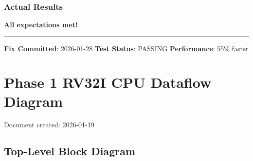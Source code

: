 \subsubsection{Actual Results}\label{cr:fix:pc-mismatch-fix:actual-results}

\begin{record}

\ok{} \textbf{All expectations met!}

\begin{center}\rule{0.5\linewidth}{0.5pt}\end{center}

\textbf{Fix Committed}: 2026-01-28 \textbf{Test Status}: \ok{} PASSING
\textbf{Performance}: \warn{} 55\% faster

\end{record}

\section{Phase 1 RV32I CPU Dataflow Diagram}\label{cr:fix:cpu-dataflow-diagram}

\begin{record}

Document created: 2026-01-19

\end{record}

\subsection{Top-Level Block Diagram}\label{cr:fix:cpu-dataflow-diagram:top-level-block-diagram}

